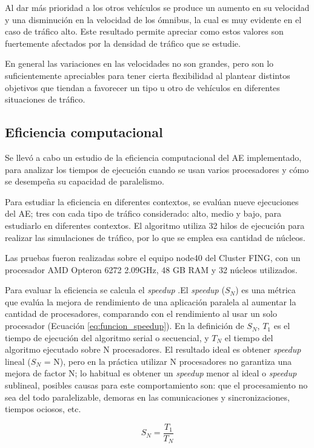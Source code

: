 Al dar más prioridad a los otros vehículos se produce un aumento en su velocidad y una disminución en la velocidad de los ómnibus, la cual es muy evidente en el caso de tráfico alto. Este resultado permite apreciar como estos valores son fuertemente afectados por la densidad de tráfico que se estudie.

En general las variaciones en las velocidades no son grandes, pero son lo suficientemente apreciables para tener cierta flexibilidad al plantear distintos objetivos que tiendan a favorecer un tipo u otro de vehículos en diferentes situaciones de tráfico.


\subsection{Eficiencia computacional}

Se llevó a cabo un estudio de la eficiencia computacional del AE implementado, para analizar los tiempos de ejecución cuando se usan varios procesadores y cómo se desempeña su capacidad de paralelismo.

Para estudiar la eficiencia en diferentes contextos, se evalúan nueve ejecuciones del AE; tres con cada tipo de tráfico considerado: alto, medio y bajo, para estudiarlo en diferentes contextos. El algoritmo utiliza 32 hilos de ejecución para realizar las simulaciones de tráfico,	 por lo que se emplea esa cantidad de núcleos.

Las pruebas fueron realizadas sobre el equipo node40 del Cluster FING, con un procesador AMD Opteron 6272 2.09GHz, 48 GB RAM y 32 núcleos utilizados.

Para evaluar la eficiencia se calcula el \emph{speedup} .El \emph{speedup} (${S_N}$) es una métrica que evalúa la mejora de rendimiento de una aplicación paralela al aumentar la cantidad de procesadores, comparando con el rendimiento al usar un solo procesador (Ecuación \ref{eq:funcion_speedup}). En la definición de ${S_N}$, ${T_1}$ es el tiempo de ejecución del algoritmo serial o secuencial, y ${T_N}$ el tiempo del algoritmo ejecutado sobre N procesadores. El resultado ideal es obtener \emph{speedup} lineal (${S_N}$ = N), pero en la práctica utilizar N procesadores no garantiza una mejora de factor N; lo habitual es obtener un \emph{speedup} menor al ideal o \emph{speedup} sublineal, posibles causas para este comportamiento son: que el procesamiento no sea del todo paralelizable, demoras en las comunicaciones y sincronizaciones, tiempos ociosos, etc.

\begin{equation}
\label{eq:funcion_speedup}
{S_N} = \frac{T_1}{T_N}
\end{equation}



